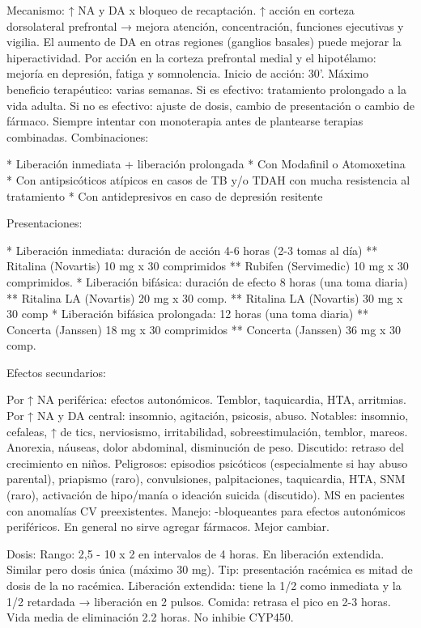 Mecanismo: ↑ NA y DA x bloqueo de recaptación. ↑ acción en corteza dorsolateral prefrontal → mejora atención, concentración, funciones ejecutivas y vigilia. El aumento de DA en otras regiones (ganglios basales) puede mejorar la hiperactividad. Por acción en la corteza prefrontal medial y el hipotélamo: mejoría en depresión, fatiga y somnolencia.
Inicio de acción: 30'. Máximo beneficio terapéutico: varias semanas.
Si es efectivo: tratamiento prolongado a la vida adulta.
Si no es efectivo: ajuste de dosis, cambio de presentación o cambio de fármaco.
Siempre intentar con monoterapia antes de plantearse terapias combinadas.
Combinaciones:

* Liberación inmediata + liberación prolongada
* Con Modafinil o Atomoxetina
* Con antipsicóticos atípicos en casos de TB y/o TDAH con mucha resistencia al tratamiento
* Con antidepresivos en caso de depresión resitente

Presentaciones:

* Liberación inmediata: duración de acción 4-6 horas (2-3 tomas al día)
** Ritalina (Novartis) 10 mg x 30 comprimidos
** Rubifen (Servimedic) 10 mg x 30 comprimidos.
* Liberación bifásica: duración de efecto 8 horas (una toma diaria)
** Ritalina LA (Novartis) 20  mg x 30 comp.
** Ritalina LA (Novartis) 30 mg x 30 comp
* Liberación bifásica  prolongada: 12 horas (una toma diaria)
** Concerta (Janssen) 18 mg x 30 comprimidos
** Concerta (Janssen) 36 mg x 30 comp.

Efectos secundarios:

Por ↑ NA periférica: efectos autonómicos. Temblor, taquicardia, HTA, arritmias.
Por ↑ NA y DA central: insomnio, agitación, psicosis, abuso.
Notables: insomnio, cefaleas, ↑ de tics, nerviosismo, irritabilidad, sobreestimulación, temblor, mareos. Anorexia, náuseas, dolor abdominal, disminución de peso. Discutido: retraso del crecimiento en niños.
Peligrosos: episodios psicóticos (especialmente si hay abuso parental), priapismo (raro), convulsiones, palpitaciones, taquicardia, HTA, SNM (raro), activación de hipo/manía o ideación suicida (discutido). MS en pacientes con anomalías CV preexistentes.
Manejo: \beta-bloqueantes para efectos autonómicos periféricos. En general no sirve agregar fármacos. Mejor cambiar.

Dosis:
Rango: 2,5 - 10 x 2 en intervalos de 4 horas. En liberación extendida. Similar pero dosis única (máximo 30 mg).
Tip: presentación racémica es mitad de dosis de la no racémica. Liberación extendida: tiene la 1/2 como inmediata y la 1/2 retardada → liberación en 2 pulsos. Comida: retrasa el pico en 2-3 horas. Vida media de eliminación 2.2 horas. No inhibie CYP450.

